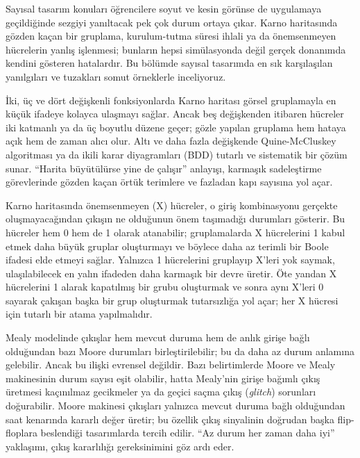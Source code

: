 Sayısal tasarım konuları öğrencilere soyut ve kesin görünse de uygulamaya geçildiğinde sezgiyi yanıltacak pek çok durum ortaya çıkar. Karno haritasında gözden kaçan bir gruplama, kurulum-tutma süresi ihlali ya da önemsenmeyen hücrelerin yanlış işlenmesi; bunların hepsi simülasyonda değil gerçek donanımda kendini gösteren hatalardır. Bu bölümde sayısal tasarımda en sık karşılaşılan yanılgıları ve tuzakları somut örneklerle inceliyoruz.

İki, üç ve dört değişkenli fonksiyonlarda Karno haritası görsel gruplamayla en küçük ifadeye kolayca ulaşmayı sağlar. Ancak beş değişkenden itibaren hücreler iki katmanlı ya da üç boyutlu düzene geçer; gözle yapılan gruplama hem hataya açık hem de zaman alıcı olur. Altı ve daha fazla değişkende Quine-McCluskey algoritması ya da ikili karar diyagramları (BDD) tutarlı ve sistematik bir çözüm sunar. ``Harita büyütülürse yine de çalışır'' anlayışı, karmaşık sadeleştirme görevlerinde gözden kaçan örtük terimlere ve fazladan kapı sayısına yol açar.

Karno haritasında önemsenmeyen (X) hücreler, o giriş kombinasyonu gerçekte oluşmayacağından çıkışın ne olduğunun önem taşımadığı durumları gösterir. Bu hücreler hem 0 hem de 1 olarak atanabilir; gruplamalarda X hücrelerini 1 kabul etmek daha büyük gruplar oluşturmayı ve böylece daha az terimli bir Boole ifadesi elde etmeyi sağlar. Yalnızca 1 hücrelerini gruplayıp X'leri yok saymak, ulaşılabilecek en yalın ifadeden daha karmaşık bir devre üretir. Öte yandan X hücrelerini 1 alarak kapatılmış bir grubu oluşturmak ve sonra aynı X'leri 0 sayarak çakışan başka bir grup oluşturmak tutarsızlığa yol açar; her X hücresi için tutarlı bir atama yapılmalıdır.

Mealy modelinde çıkışlar hem mevcut duruma hem de anlık girişe bağlı olduğundan bazı Moore durumları birleştirilebilir; bu da daha az durum anlamına gelebilir. Ancak bu ilişki evrensel değildir. Bazı belirtimlerde Moore ve Mealy makinesinin durum sayısı eşit olabilir, hatta Mealy'nin girişe bağımlı çıkış üretmesi kaçınılmaz gecikmeler ya da geçici saçma çıkış (\emph{glitch}) sorunları doğurabilir. Moore makinesi çıkışları yalnızca mevcut duruma bağlı olduğundan saat kenarında kararlı değer üretir; bu özellik çıkış sinyalinin doğrudan başka flip-floplara beslendiği tasarımlarda tercih edilir. ``Az durum her zaman daha iyi'' yaklaşımı, çıkış kararlılığı gereksinimini göz ardı eder.

